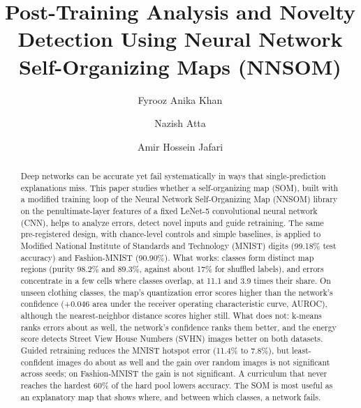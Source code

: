 \documentclass[preprint,review,12pt]{elsarticle}
\begin{document}
\begin{frontmatter}

\title{Post-Training Analysis and Novelty Detection Using Neural Network Self-Organizing Maps (NNSOM)}

\author[gwu]{Fyrooz Anika Khan}
\author[gwu]{Nazish Atta}
\author[gwu]{Amir Hossein Jafari}

\begin{abstract}
Deep networks can be accurate yet fail systematically in ways that single-prediction explanations miss. This paper studies whether a self-organizing map (SOM), built with a modified training loop of the Neural Network Self-Organizing Map (NNSOM) library on the penultimate-layer features of a fixed LeNet-5 convolutional neural network (CNN), helps to analyze errors, detect novel inputs and guide retraining. The same pre-registered design, with chance-level controls and simple baselines, is applied to Modified National Institute of Standards and Technology (MNIST) digits (99.18\% test accuracy) and Fashion-MNIST (90.90\%). What works: classes form distinct map regions (purity 98.2\% and 89.3\%, against about 17\% for shuffled labels), and errors concentrate in a few cells where classes overlap, at 11.1 and 3.9 times their share. On unseen clothing classes, the map's quantization error scores higher than the network's confidence (+0.046 area under the receiver operating characteristic curve, AUROC), although the nearest-neighbor distance scores higher still. What does not: k-means ranks errors about as well, the network's confidence ranks them better, and the energy score detects Street View House Numbers (SVHN) images better on both datasets. Guided retraining reduces the MNIST hotspot error (11.4\% to 7.8\%), but least-confident images do about as well and the gain over random images is not significant across seeds; on Fashion-MNIST the gain is not significant. A curriculum that never reaches the hardest 60\% of the hard pool lowers accuracy. The SOM is most useful as an explanatory map that shows where, and between which classes, a network fails.
\end{abstract}


\end{frontmatter}
\end{document}
